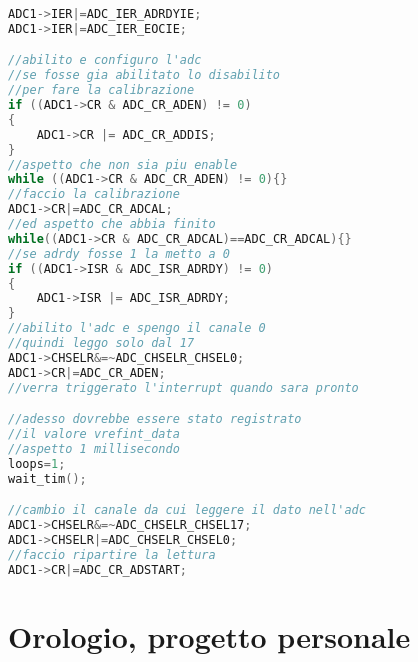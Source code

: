 \documentclass[main.tex]{subfiles}
\begin{document}
\begin{lstlisting}[language=C,caption=Inizializzazione ADC]
ADC1->IER|=ADC_IER_ADRDYIE;
ADC1->IER|=ADC_IER_EOCIE;

//abilito e configuro l'adc
//se fosse gia abilitato lo disabilito
//per fare la calibrazione
if ((ADC1->CR & ADC_CR_ADEN) != 0)
{
	ADC1->CR |= ADC_CR_ADDIS;
}
//aspetto che non sia piu enable
while ((ADC1->CR & ADC_CR_ADEN) != 0){}
//faccio la calibrazione
ADC1->CR|=ADC_CR_ADCAL;
//ed aspetto che abbia finito
while((ADC1->CR & ADC_CR_ADCAL)==ADC_CR_ADCAL){}
//se adrdy fosse 1 la metto a 0
if ((ADC1->ISR & ADC_ISR_ADRDY) != 0)
{
	ADC1->ISR |= ADC_ISR_ADRDY;
}
//abilito l'adc e spengo il canale 0
//quindi leggo solo dal 17
ADC1->CHSELR&=~ADC_CHSELR_CHSEL0;
ADC1->CR|=ADC_CR_ADEN;
//verra triggerato l'interrupt quando sara pronto

//adesso dovrebbe essere stato registrato
//il valore vrefint_data
//aspetto 1 millisecondo
loops=1;
wait_tim();

//cambio il canale da cui leggere il dato nell'adc
ADC1->CHSELR&=~ADC_CHSELR_CHSEL17;
ADC1->CHSELR|=ADC_CHSELR_CHSEL0;
//faccio ripartire la lettura
ADC1->CR|=ADC_CR_ADSTART;
\end{lstlisting}

\section{Orologio, progetto personale}
\end{document}
